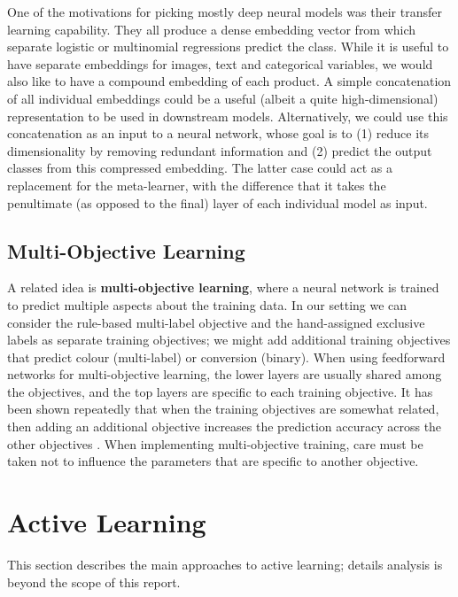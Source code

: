 One of the motivations for picking mostly deep neural models was their transfer learning capability.
They all produce a dense embedding vector from which separate logistic or multinomial regressions predict the class.
While it is useful to have separate embeddings for images, text and categorical variables, we would also like to have a compound embedding of each product.
A simple concatenation of all individual embeddings could be a useful (albeit a quite high-dimensional) representation to be used in downstream models.
Alternatively, we could use this concatenation as an input to a neural network, whose goal is to (1) reduce its dimensionality by removing redundant information and (2) predict the output classes from this compressed embedding.
The latter case could act as a replacement for the meta-learner, with the difference that it takes the penultimate (as opposed to the final) layer of each individual model as input.


\subsection{Multi-Objective Learning}
\label{multiobj}

A related idea is \textbf{multi-objective learning}, where a neural network is trained to predict multiple aspects about the training data.
In our setting we can consider the rule-based multi-label objective and the hand-assigned exclusive labels as separate training objectives; we might add additional training objectives that predict colour (multi-label) or conversion (binary).
When using feedforward networks for multi-objective learning, the lower layers are usually shared among the objectives, and the top layers are specific to each training objective.
It has been shown repeatedly that when the training objectives are somewhat related, then adding an additional objective increases the prediction accuracy across the other objectives \cite{}.
When implementing multi-objective training, care must be taken not to influence the parameters that are specific to another objective.



\section{Active Learning}
\label{bg_al}

This section describes the main approaches to active learning;  details analysis is beyond the scope of this report.


